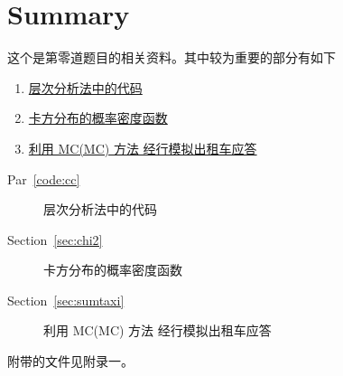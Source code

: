 
\section*{Summary}
\label{sec:sum}
这个是第零道题目的相关资料。其中较为重要的部分有如下
\ifdefined\pandoc
\begin{enumerate}
    \item \href{#code:cc}{层次分析法中的代码}
    \item \href{#sec:chi2}{卡方分布的概率密度函数}
    \item \href{#sec:sumtaxi}{利用 MC(MC) 方法 经行模拟出租车应答}
\end{enumerate}
\pandoc
\else
\begin{description}
    \item [Par~\ref{code:cc}]  层次分析法中的代码
    \item [Section~\ref{sec:chi2}] 卡方分布的概率密度函数
    \item [Section~\ref{sec:sumtaxi}] 利用 MC(MC) 方法 经行模拟出租车应答
\end{description}
\fi
附带的文件见附录一。
\endinput